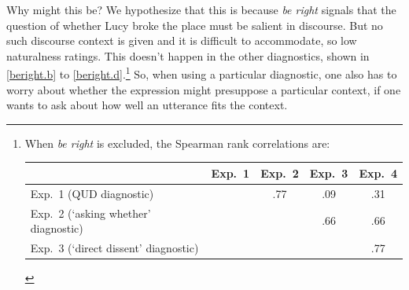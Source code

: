\documentclass[times,linguex,xcolor]{glossa}
\newcommand{\lh}[1]{\textbf{\color{Cerulean}LH: #1}}
\begin{document}
      Why might this be? We hypothesize that this is because \emph{be right} signals that the question of whether Lucy broke the place must be salient in discourse. But no such discourse context is given and it is difficult to accommodate, so low naturalness ratings. This doesn't happen in the other diagnostics, shown in \ref{beright.b} to \ref{beright.d}.\footnote{When \emph{be right} is excluded, the Spearman rank correlations are:

      \begin{tabular}{l | c c c c}
      & Exp.~1 & Exp.~2 & Exp.~3 & Exp.~4 \\ \hline
      Exp.~1 (QUD diagnostic) & \cellcolor{lightgray} & .77 & .09 & .31 \\
      Exp.~2 (`asking whether' diagnostic) & \cellcolor{lightgray} & \cellcolor{lightgray} & .66 & .66 \\
      Exp.~3 (`direct dissent' diagnostic) & \cellcolor{lightgray}& \cellcolor{lightgray} & \cellcolor{lightgray} & .77  \\
      \hline
      \end{tabular}} So, when using a particular diagnostic, one also has to worry about whether the expression might presuppose a particular context, if one wants to ask about how well an utterance fits the context.


\end{document}
